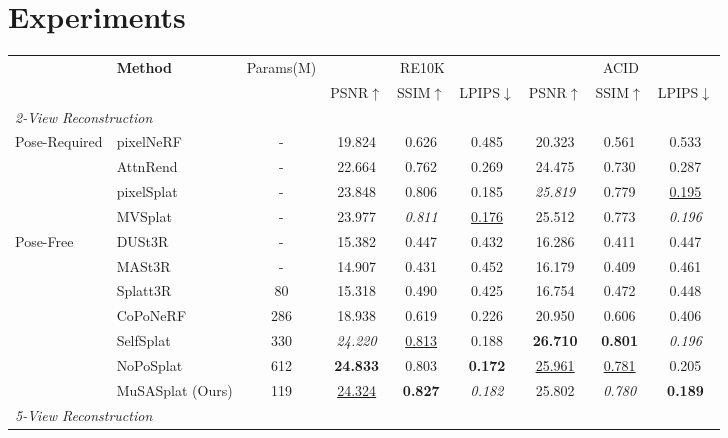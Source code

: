 \documentclass[letterpaper]{article} %
\begin{document}
\section{Experiments}
\label{sec:experiment}
\begin{table}[t]
\centering
\renewcommand{\arraystretch}{1.2}
\setlength{\tabcolsep}{0.9mm}
\begin{tabular}{ll|c|ccc|ccc}
\toprule
& \textbf{Method} 
& Params(M)
& \multicolumn{3}{c|}{RE10K} 
& \multicolumn{3}{c}{ACID} \\
& && PSNR$\uparrow$ & SSIM$\uparrow$ & LPIPS$\downarrow$
  & PSNR$\uparrow$ & SSIM$\uparrow$ & LPIPS$\downarrow$ \\
\midrule
\multicolumn{8}{l}{\textit{2-View Reconstruction}} \\
\midrule
\multirow{4}{*}{Pose-Required}
& pixelNeRF~\cite{yu2021pixelnerf}  & -         & 19.824 & 0.626 & 0.485 & 20.323 & 0.561 & 0.533 \\
& AttnRend~\cite{du2023learning}   & -         & 22.664 & 0.762 & 0.269 & 24.475 & 0.730 & 0.287 \\
& pixelSplat~\cite{charatan2024pixelsplat}   & -       & 23.848 & 0.806 & 0.185 & \textit{25.819} & 0.779 & \underline{0.195} \\
& MVSplat~\cite{chen2024mvsplat} & -            & 23.977 & \textit{0.811} & \underline{0.176} & 25.512 & 0.773 & \textit{0.196} \\
\midrule
\multirow{7}{*}{Pose-Free}
& DUSt3R~\cite{wang2024dust3r}    & -          & 15.382 & 0.447 & 0.432 & 16.286 & 0.411 & 0.447 \\
& MASt3R~\cite{leroy2024grounding}  & -           & 14.907 & 0.431 & 0.452 & 16.179 & 0.409 & 0.461 \\
& Splatt3R~\cite{smart2024splatt3r}  & 80    & 15.318 & 0.490 & 0.425 & 16.754 & 0.472 & 0.448 \\
& CoPoNeRF ~\cite{hong2024unifying}& 286     & 18.938 & 0.619 & 0.226 & 20.950 & 0.606 & 0.406 \\
& SelfSplat ~\cite{kang2025selfsplat}  & 330  & \textit{24.220} & \underline{0.813} & 0.188 & \textbf{26.710} & \textbf{0.801} & \textit{0.196} \\
& NoPoSplat~\cite{ye2024no} &612   & \textbf{24.833} & 0.803 & \textbf{0.172} & \underline{25.961} & \underline{0.781} & 0.205 \\
& MuSASplat (Ours) &119 & \underline{24.324} & \textbf{0.827} & \textit{0.182} & 25.802 & \textit{0.780} & \textbf{0.189} \\
\midrule
\multicolumn{8}{l}{\textit{5-View Reconstruction}} \\

\end{tabular}
\end{table}
\end{document}
